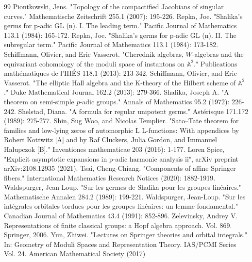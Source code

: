 \documentclass{amsart}
\numberwithin{equation}{section}
\theoremstyle{definition}
\begin{document}
\begin{thebibliography}{99}
 Piontkowski, Jens. "Topology of the compactified Jacobians of singular curves." Mathematische Zeitschrift 255.1 (2007): 195-226.
 Repka, Joe. "Shalika’s germs for p-adic GL (n). I. The leading term." Pacific Journal of Mathematics 113.1 (1984): 165-172.
 Repka, Joe. "Shalika’s germs for p-adic GL (n). II. The subregular term." Pacific Journal of Mathematics 113.1 (1984): 173-182.
 Schiffmann, Olivier, and Eric Vasserot. "Cherednik algebras, $W$-algebras and the equivariant cohomology of the moduli space of instantons on $\mathbb{A}^2$." Publications mathématiques de l'IH\'ES 118.1 (2013): 213-342.
 Schiffmann, Olivier, and Eric Vasserot. "The elliptic Hall algebra and the K-theory of the Hilbert scheme of $\mathbb{A}^2$." Duke Mathematical Journal 162.2 (2013): 279-366.
 Shalika, Joseph A. "A theorem on semi-simple $p$-adic groups." Annals of Mathematics 95.2 (1972): 226-242.
 Shelstad, Diana. "A formula for regular unipotent germs." Ast\'erisque 171.172 (1989): 275-277.
 Shin, Sug Woo, and Nicolas Templier. "Sato–Tate theorem for families and low-lying zeros of automorphic L L-functions: With appendices by Robert Kottwitz [A] and by Raf Cluckers, Julia Gordon, and Immanuel Halupczok [B]." Inventiones mathematicae 203 (2016): 1-177.
 Loren Spice, "Explicit asymptotic expansions in p-adic harmonic analysis ii", arXiv preprint arXiv:2108.12935 (2021).
 Tsai, Cheng-Chiang. "Components of affine Springer fibers." International Mathematics Research Notices (2020): 1882-1919.
 Waldspurger, Jean-Loup. "Sur les germes de Shalika pour les groupes linéaires." Mathematische Annalen 284.2 (1989): 199-221.
 Waldspurger, Jean-Loup. "Sur les intégrales orbitales tordues pour les groupes linéaires: un lemme fondamental." Canadian Journal of Mathematics 43.4 (1991): 852-896.
 Zelevinsky, Andrey V. Representations of finite classical groups: a Hopf algebra approach. Vol. 869. Springer, 2006.
  Yun, Zhiwei. "Lectures on Springer theories and orbital integrals." In: Geometry of Moduli Spaces and Representation Theory. IAS/PCMI Series Vol. 24. American Mathematical Society (2017) 
\end{thebibliography}
\end{document}
